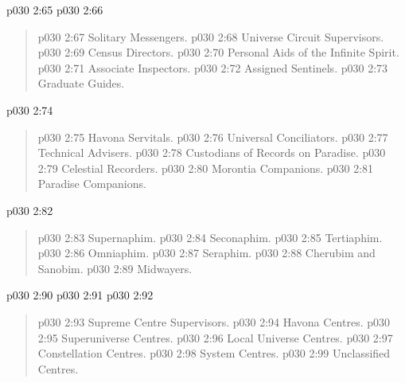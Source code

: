 \vsetspace
\vs p030 2:65 \bibnobreakspace {}
\vsetspace
\vs p030 2:66 \bibnobreakspace {}
\begin{quote}
\vs p030 2:67 \bibnobreakspace Solitary Messengers.
\vs p030 2:68 \bibnobreakspace Universe Circuit Supervisors.
\vs p030 2:69 \bibnobreakspace Census Directors.
\vs p030 2:70 \bibnobreakspace Personal Aids of the Infinite Spirit.
\vs p030 2:71 \bibnobreakspace Associate Inspectors.
\vs p030 2:72 \bibnobreakspace Assigned Sentinels.
\vs p030 2:73 \bibnobreakspace Graduate Guides.
\end{quote}
\vsetspace
\vs p030 2:74 \bibnobreakspace {}
\begin{quote}
\vs p030 2:75 \bibnobreakspace Havona Servitals.
\vs p030 2:76 \bibnobreakspace Universal Conciliators.
\vs p030 2:77 \bibnobreakspace Technical Advisers.
\vs p030 2:78 \bibnobreakspace Custodians of Records on Paradise.
\vs p030 2:79 \bibnobreakspace Celestial Recorders.
\vs p030 2:80 \bibnobreakspace Morontia Companions.
\vs p030 2:81 \bibnobreakspace Paradise Companions.
\end{quote}
\vsetspace
\vs p030 2:82 \bibnobreakspace {}
\begin{quote}
\vs p030 2:83 \bibnobreakspace Supernaphim.
\vs p030 2:84 \bibnobreakspace Seconaphim.
\vs p030 2:85 \bibnobreakspace Tertiaphim.
\vs p030 2:86 \bibnobreakspace Omniaphim.
\vs p030 2:87 \bibnobreakspace Seraphim.
\vs p030 2:88 \bibnobreakspace Cherubim and Sanobim.
\vs p030 2:89 \bibnobreakspace Midwayers.
\end{quote}
\vsetspace
\vs p030 2:90 \bibnobreakspace {}
\vsetspace
\vs p030 2:91 \bibnobreakspace {}
\vsetspace
\vs p030 2:92 \bibnobreakspace {}
\begin{quote}
\vs p030 2:93 \bibnobreakspace Supreme Centre Supervisors.
\vs p030 2:94 \bibnobreakspace Havona Centres.
\vs p030 2:95 \bibnobreakspace Superuniverse Centres.
\vs p030 2:96 \bibnobreakspace Local Universe Centres.
\vs p030 2:97 \bibnobreakspace Constellation Centres.
\vs p030 2:98 \bibnobreakspace System Centres.
\vs p030 2:99 \bibnobreakspace Unclassified Centres.
\end{quote}
